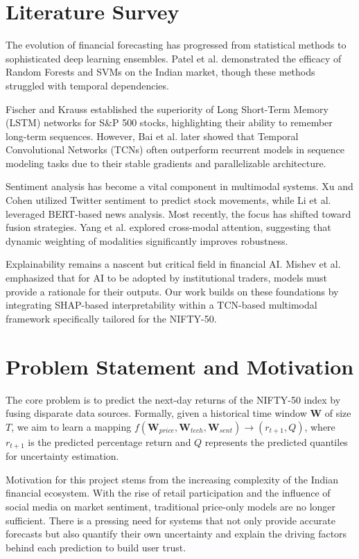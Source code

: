 \documentclass[conference]{IEEEtran}
\begin{document}
\section{Literature Survey}
The evolution of financial forecasting has progressed from statistical methods to sophisticated deep learning ensembles. Patel et al. \cite{patel2015} demonstrated the efficacy of Random Forests and SVMs on the Indian market, though these methods struggled with temporal dependencies. 

Fischer and Krauss \cite{fischer2018} established the superiority of Long Short-Term Memory (LSTM) networks for S\&P 500 stocks, highlighting their ability to remember long-term sequences. However, Bai et al. \cite{bai2018} later showed that Temporal Convolutional Networks (TCNs) often outperform recurrent models in sequence modeling tasks due to their stable gradients and parallelizable architecture.

Sentiment analysis has become a vital component in multimodal systems. Xu and Cohen \cite{xu2018} utilized Twitter sentiment to predict stock movements, while Li et al. \cite{li2020sentiment} leveraged BERT-based news analysis. Most recently, the focus has shifted toward fusion strategies. Yang et al. \cite{yang2023multimodal} explored cross-modal attention, suggesting that dynamic weighting of modalities significantly improves robustness.

Explainability remains a nascent but critical field in financial AI. Mishev et al. \cite{mishev2020} emphasized that for AI to be adopted by institutional traders, models must provide a rationale for their outputs. Our work builds on these foundations by integrating SHAP-based interpretability within a TCN-based multimodal framework specifically tailored for the NIFTY-50.

\section{Problem Statement and Motivation}
The core problem is to predict the next-day returns of the NIFTY-50 index by fusing disparate data sources. Formally, given a historical time window $\mathbf{W}$ of size $T$, we aim to learn a mapping $f(\mathbf{W}_{price}, \mathbf{W}_{tech}, \mathbf{W}_{sent}) \rightarrow (r_{t+1}, Q)$, where $r_{t+1}$ is the predicted percentage return and $Q$ represents the predicted quantiles for uncertainty estimation.

Motivation for this project stems from the increasing complexity of the Indian financial ecosystem. With the rise of retail participation and the influence of social media on market sentiment, traditional price-only models are no longer sufficient. There is a pressing need for systems that not only provide accurate forecasts but also quantify their own uncertainty and explain the driving factors behind each prediction to build user trust.
\end{document}
